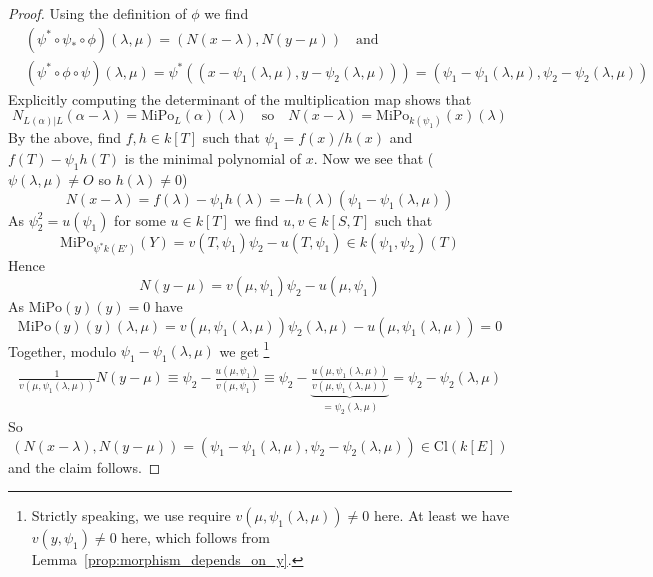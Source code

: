 \documentclass{scrartcl}
\renewcommand{\O}{O}
\theoremstyle{definition}
\begin{document}
\begin{proof}
    Using the definition of $\phi$ we find
    \begin{align*}
        &(\psi^* \circ \psi_* \circ \phi)(\lambda, \mu) = ( N(x - \lambda), N(y - \mu) ) \quad \text{and} \\
        &(\psi^* \circ \phi \circ \psi)(\lambda, \mu) = \psi^*\left(( x - \psi_1(\lambda, \mu), y - \psi_2(\lambda, \mu) )\right)  = ( \psi_1 - \psi_1(\lambda, \mu), \psi_2 - \psi_2(\lambda, \mu) )
    \end{align*}
    Explicitly computing the determinant of the multiplication map shows that
    \begin{equation*}
        N_{L(\alpha)|L}(\alpha - \lambda) = \mathrm{MiPo}_L(\alpha)(\lambda) \quad \text{so} \quad N(x - \lambda) = \mathrm{MiPo}_{k(\psi_1)}(x)(\lambda)
    \end{equation*}
    By the above, find $f, h \in k[T]$ such that $\psi_1 = f(x)/h(x)$ and $f(T) - \psi_1h(T)$ is the minimal polynomial of $x$.
    Now we see that ($\psi(\lambda, \mu) \neq \O$ so $h(\lambda) \neq 0$)
    \begin{equation*}
        N(x - \lambda) = f(\lambda) - \psi_1h(\lambda) = -h(\lambda)(\psi_1 - \psi_1(\lambda, \mu))
    \end{equation*}
    As $\psi_2^2 = u(\psi_1)$ for some $u \in k[T]$ we find $u, v \in k[S, T]$ such that
    \begin{equation*}
        \mathrm{MiPo}_{\psi^*k(E')}(Y) = v(T, \psi_1)\psi_2 - u(T, \psi_1) \in k(\psi_1, \psi_2)(T)
    \end{equation*}
    Hence
    \begin{equation*}
        N(y - \mu) = v(\mu, \psi_1)\psi_2 - u(\mu, \psi_1)
    \end{equation*}
    As $\mathrm{MiPo}(y)(y) = 0$ have
    \begin{equation*}
        \mathrm{MiPo}(y)(y)(\lambda, \mu) = v(\mu, \psi_1(\lambda, \mu))\psi_2(\lambda, \mu) - u(\mu, \psi_1(\lambda, \mu)) = 0
    \end{equation*}
    Together, modulo $\psi_1 - \psi_1(\lambda, \mu)$ we get
    \footnote{Strictly speaking, we use require $v(\mu, \psi_1(\lambda, \mu)) \neq 0$ here.
    At least we have $v(y, \psi_1) \neq 0$ here, which follows from Lemma~\ref{prop:morphism_depends_on_y}.}
    \begin{align*}
        \frac 1 {v(\mu, \psi_1(\lambda, \mu))} N(y - \mu) \equiv \psi_2 - \frac {u(\mu, \psi_1)} {v(\mu, \psi_1)} \equiv \psi_2 - \underbrace{\frac {u(\mu, \psi_1(\lambda, \mu))} {v(\mu, \psi_1(\lambda, \mu))}}_{= \psi_2(\lambda, \mu)} = \psi_2 - \psi_2(\lambda, \mu)
    \end{align*}
    So
    \begin{equation*}
        ( N(x - \lambda), N(y - \mu) ) = ( \psi_1 - \psi_1(\lambda, \mu), \psi_2 - \psi_2(\lambda, \mu) ) \in \mathrm{Cl}(k[E])
    \end{equation*}
    and the claim follows.
\end{proof}
\end{document}
